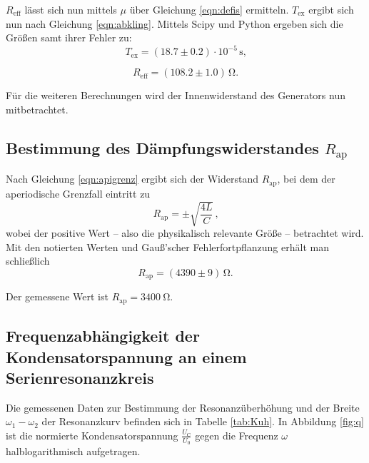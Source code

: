 $R_\text{eff}$ lässt sich nun mittels $\mu$ über Gleichung \eqref{eqn:defis} ermitteln. $T_\text{ex}$ ergibt sich nun nach Gleichung \eqref{eqn:abkling}.
Mittels Scipy und Python ergeben sich die Größen samt ihrer Fehler zu:
\begin{equation*}
	T_{\text{ex}}=(18.7 \pm 0.2) \cdot 10^{-5}\,\si{\second} \text{,}
\end{equation*}

\begin{equation*}
	R_{\text{eff}}= (108.2 \pm 1.0) \,\si{\ohm} \text{.}
\end{equation*}

Für die weiteren Berechnungen wird der Innenwiderstand des Generators nun mitbetrachtet.

\subsection{Bestimmung des Dämpfungswiderstandes $R_{\text{ap}}$}

Nach Gleichung \eqref{eqn:apigrenz} ergibt sich der Widerstand $R_{\text{ap}}$, bei dem der
aperiodische Grenzfall eintritt zu
\begin{equation}
	R_{\text{ap}} = \pm \sqrt{\frac{4L}{C}} \, \text{,}
	\label{eqn:rap}
\end{equation}
wobei der positive Wert -- also die physikalisch relevante Größe -- betrachtet wird.
Mit den notierten Werten und Gauß'scher Fehlerfortpflanzung erhält man schließlich
\begin{equation*}
	R_{\text{ap}} = (4390 \pm 9) \, \si{\ohm} \text{.}
\end{equation*}

Der gemessene Wert ist $R_{\text{ap}} = \SI{3400}{\ohm}$.
\subsection{Frequenzabhängigkeit der Kondensatorspannung an einem Serienresonanzkreis}
Die gemessenen Daten zur Bestimmung der Resonanzüberhöhung und der Breite $ \omega_1 - \omega_2 $ der Resonanzkurv befinden sich in Tabelle \ref{tab:Kuh}.
In Abbildung \ref{fig:q} ist die normierte Kondensatorspannung $\frac{U_{\mathrm{C}}}{U_{\mathrm{0}}}$ gegen die Frequenz $\omega$ halblogarithmisch aufgetragen.

